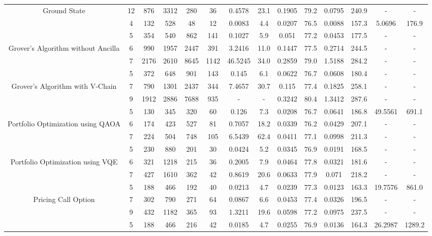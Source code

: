 \begin{table}[htb]
{\begin{tabular}{|c|c|c|c|c|c|c|c|c|c|c|c|c|c|}
Ground State & 
12 & 876 & 3312 & 280 & 36
 & 0.4578 & 23.1
 & 0.1905 & 79.2
 & 0.0795 & 240.9
 & - & -
 \\
 & 
4 & 132 & 528 & 48 & 12
 & 0.0083 & 4.4
 & 0.0207 & 76.5
 & 0.0088 & 157.3
 & 5.0696 & 176.9
 \\
\hline
 & 
5 & 354 & 540 & 862 & 141
 & 0.1027 & 5.9
 & 0.051 & 77.2
 & 0.0453 & 177.5
 & - & -
 \\
Grover's Algorithm without Ancilla & 
6 & 990 & 1957 & 2447 & 391
 & 3.2416 & 11.0
 & 0.1447 & 77.5
 & 0.2714 & 244.5
 & - & -
 \\
 & 
7 & 2176 & 2610 & 8645 & 1142
 & 46.5245 & 34.0
 & 0.2859 & 79.0
 & 1.5188 & 284.2
 & - & -
 \\
\hline
 & 
5 & 372 & 648 & 901 & 143
 & 0.145 & 6.1
 & 0.0622 & 76.7
 & 0.0608 & 180.4
 & - & -
 \\
Grover's Algorithm with V-Chain & 
7 & 790 & 1301 & 2437 & 344
 & 7.4657 & 30.7
 & 0.115 & 77.4
 & 0.1825 & 258.1
 & - & -
 \\
 & 
9 & 1912 & 2886 & 7688 & 935
 & - & -
 & 0.3242 & 80.4
 & 1.3412 & 287.6
 & - & -
 \\
\hline
 & 
5 & 130 & 345 & 320 & 60
 & 0.126 & 7.3
 & 0.0208 & 76.7
 & 0.0641 & 186.8
 & 49.5561 & 691.1
 \\
Portfolio Optimization using QAOA & 
6 & 174 & 423 & 527 & 81
 & 0.7057 & 18.2
 & 0.0339 & 76.2
 & 0.0429 & 207.1
 & - & -
 \\
 & 
7 & 224 & 504 & 748 & 105
 & 6.5439 & 62.4
 & 0.0411 & 77.1
 & 0.0998 & 211.3
 & - & -
 \\
\hline
 & 
5 & 230 & 880 & 201 & 30
 & 0.0424 & 5.2
 & 0.0345 & 76.9
 & 0.0191 & 168.5
 & - & -
 \\
Portfolio Optimization using VQE & 
6 & 321 & 1218 & 215 & 36
 & 0.2005 & 7.9
 & 0.0464 & 77.8
 & 0.0321 & 181.6
 & - & -
 \\
 & 
7 & 427 & 1610 & 362 & 42
 & 0.8619 & 20.6
 & 0.0633 & 77.9
 & 0.071 & 218.2
 & - & -
 \\
\hline
 & 
5 & 188 & 466 & 192 & 40
 & 0.0213 & 4.7
 & 0.0239 & 77.3
 & 0.0123 & 163.3
 & 19.7576 & 861.0
 \\
Pricing Call Option & 
7 & 302 & 790 & 271 & 64
 & 0.0867 & 6.6
 & 0.0453 & 77.4
 & 0.0326 & 196.5
 & - & -
 \\
 & 
9 & 432 & 1182 & 365 & 93
 & 1.3211 & 19.6
 & 0.0598 & 77.2
 & 0.0975 & 237.5
 & - & -
 \\
\hline
 & 
5 & 188 & 466 & 216 & 42
 & 0.0185 & 4.7
 & 0.0255 & 76.9
 & 0.0136 & 164.3
 & 26.2987 & 1289.2

\end{tabular}}
\end{table}
